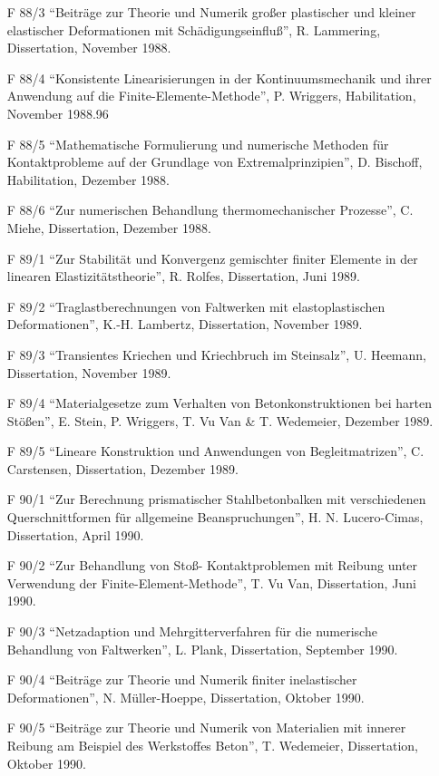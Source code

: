 \begin{itemize}
    \item[F 88/3] ``Beiträge zur Theorie und Numerik großer plastischer und kleiner elastischer Deformationen mit Schädigungseinfluß”, R. Lammering, Dissertation, November 1988.
    \item[F 88/4] ``Konsistente Linearisierungen in der Kontinuumsmechanik und ihrer Anwendung auf die Finite-Elemente-Methode”, P. Wriggers, Habilitation, November 1988.96
    \item[F 88/5] ``Mathematische Formulierung und numerische Methoden für Kontaktprobleme auf der Grundlage von Extremalprinzipien”, D. Bischoff, Habilitation, Dezember 1988.
    \item[F 88/6] ``Zur numerischen Behandlung thermomechanischer Prozesse”, C. Miehe, Dissertation, Dezember 1988.
    \item[F 89/1] ``Zur Stabilität und Konvergenz gemischter finiter Elemente in der linearen Elastizitätstheorie”, R. Rolfes, Dissertation, Juni 1989.
    \item[F 89/2] ``Traglastberechnungen von Faltwerken mit elastoplastischen Deformationen”, K.-H. Lambertz, Dissertation, November 1989.
    \item[F 89/3] ``Transientes Kriechen und Kriechbruch im Steinsalz”, U. Heemann, Dissertation, November 1989.
    \item[F 89/4] ``Materialgesetze zum Verhalten von Betonkonstruktionen bei harten Stößen”, E. Stein, P. Wriggers, T. Vu Van \& T. Wedemeier, Dezember 1989.
    \item[F 89/5] ``Lineare Konstruktion und Anwendungen von Begleitmatrizen”, C. Carstensen, Dissertation, Dezember 1989.
    \item[F 90/1] ``Zur Berechnung prismatischer Stahlbetonbalken mit verschiedenen Querschnittformen für allgemeine Beanspruchungen”, H. N. Lucero-Cimas, Dissertation, April 1990.
    \item[F 90/2] ``Zur Behandlung von Stoß- Kontaktproblemen mit Reibung unter Verwendung der Finite-Element-Methode”, T. Vu Van, Dissertation, Juni 1990.
    \item[F 90/3] ``Netzadaption und Mehrgitterverfahren für die numerische Behandlung von Faltwerken”, L. Plank, Dissertation, September 1990.
    \item[F 90/4] ``Beiträge zur Theorie und Numerik finiter inelastischer Deformationen”, N. Müller-Hoeppe, Dissertation, Oktober 1990.
    \item[F 90/5] ``Beiträge zur Theorie und Numerik von Materialien mit innerer Reibung am Beispiel des Werkstoffes Beton”, T. Wedemeier, Dissertation, Oktober 1990.

\end{itemize}
